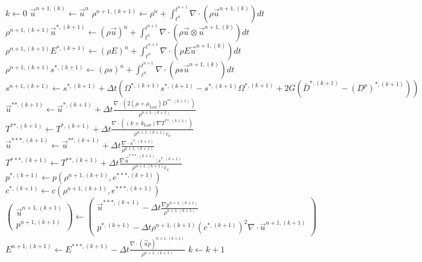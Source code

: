 \documentclass[]{article}
\begin{document}
\begin{algorithm}
\caption{Asymptotically Preserving time discretization for an elastic material\label{asym_preserve_elastic}}
\begin{algorithmic}[1] %
\State $k \gets 0$
\State $\vec{u}^{n+1,(k)} \gets \vec{u}^{n}$
 \State $\rho^{n+1,(k+1)}\gets \rho^{n}+\int_{t^{n}}^{t^{n+1}}\nabla\cdot(\rho\vec{u}^{n+1,(k)})dt$ 
 \State $\rho^{n+1,(k+1)}\vec{u}^{\ast,(k+1)}\gets (\rho\vec{u})^{n}+\int_{t^{n}}^{t^{n+1}}\nabla\cdot(\rho\vec{u}\otimes\vec{u}^{n+1,(k)})dt$
 \State $\rho^{n+1,(k+1)}E^{\ast,(k+1)}\gets (\rho E)^{n}+\int_{t^{n}}^{t^{n+1}}\nabla\cdot(\rho E \vec{u}^{n+1,(k)})dt$
 \State $\rho^{n+1,(k+1)}s^{\ast,(k+1)}\gets (\rho s)^{n}+\int_{t^{n}}^{t^{n+1}}\nabla\cdot(\rho s \vec{u}^{n+1,(k)})dt$
 \State $s^{n+1,(k+1)}\gets s^{\ast,(k+1)}+\Delta t(\Omega^{\ast,(k+1)}s^{\ast,(k+1)}-s^{\ast,(k+1)}\Omega^{\ast,(k+1)}+2G(\bar{D}^{\ast,(k+1)}-(D^{p})^{\ast,(k+1)}))$
 \State $\vec{u}^{\ast\ast,(k+1)}\gets\vec{u}^{\ast,(k+1)}+\Delta t \frac{\nabla\cdot (2(\mu+\mu_{\mbox{Lax}})D^{\ast\ast,(k+1)})}{\rho^{n+1,(k+1)}}$
 \State $T^{\ast\ast,(k+1)}\gets T^{\ast,(k+1)}+\Delta t \frac{\nabla\cdot ((k+k_{\mbox{Lax}})\nabla T^{\ast\ast,(k+1)})}{\rho^{n+1,(k+1)}c_{v}}$
 \State $\vec{u}^{\ast\ast\ast,(k+1)}\gets\vec{u}^{\ast\ast,(k+1)}+\Delta t\frac{\nabla\cdot s^{\ast,(k+1)}}{\rho^{n+1,(k+1)}}$
 \State $T^{\ast\ast\ast,(k+1)}\gets T^{\ast\ast,(k+1)}+\Delta t\frac{\nabla\vec{u}^{\ast\ast\ast,(k+1)}:s^{\ast,(k+1)}}{\rho^{n+1,(k+1)}c_{v}}$
 \State $p^{\ast,(k+1)}\gets p(\rho^{n+1,(k+1)},e^{\ast\ast\ast,(k+1)})$
 \State $c^{\ast,(k+1)}\gets c(\rho^{n+1,(k+1)},e^{\ast\ast\ast,(k+1)})$
 \State $\left( \begin{array}{c} \vec{u}^{n+1,(k+1)} \\ 
           p^{n+1,(k+1)} \end{array}\right)\gets
  \left( \begin{array}{c} 
    \vec{u}^{\ast\ast\ast,(k+1)}-\Delta t\frac{\nabla p^{n+1,(k+1)}}{\rho^{n+1,(k+1)}} \\
  p^{\ast,(k+1)}-\Delta t \rho^{n+1,(k+1)} (c^{\ast,(k+1)})^{2} \nabla\cdot\vec{u}^{n+1,(k+1)}\end{array}\right)$
\State $E^{n+1,(k+1)}\gets E^{\ast\ast\ast,(k+1)}-
	\Delta t\frac{\nabla\cdot(\vec{u}p)^{n+1,(k+1)}}{\rho^{n+1,(k+1)}}$
 \State $k \gets k+1$
\EndWhile
\end{algorithmic}
\end{algorithm}
\end{document}
